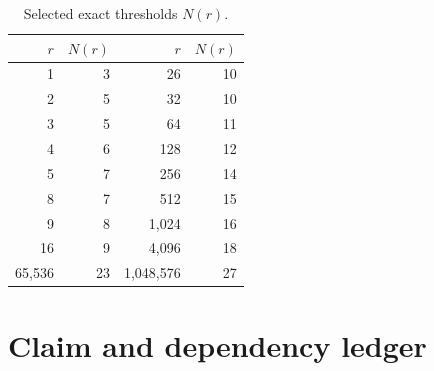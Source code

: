 \documentclass[11pt,letterpaper]{article}
\numberwithin{equation}{section}
\theoremstyle{plain}
\theoremstyle{definition}
\theoremstyle{remark}
\begin{document}
\begin{table}[H]
\centering
\caption{Selected exact thresholds $N(r)$.}
\label{bwc:tab:thresholds}
\begin{tabular}{r@{\qquad}r|r@{\qquad}r}
\toprule
$r$ & $N(r)$ & $r$ & $N(r)$\\
\midrule
1 & 3 & 26 & 10 \\
2 & 5 & 32 & 10 \\
3 & 5 & 64 & 11 \\
4 & 6 & 128 & 12 \\
5 & 7 & 256 & 14 \\
8 & 7 & 512 & 15 \\
9 & 8 & 1{,}024 & 16 \\
16 & 9 & 4{,}096 & 18 \\
65{,}536 & 23 & 1{,}048{,}576 & 27 \\
\bottomrule
\end{tabular}
\end{table}

\clearpage %
\section{Claim and dependency ledger}\label{bwc:app:ledger}
\end{document}
